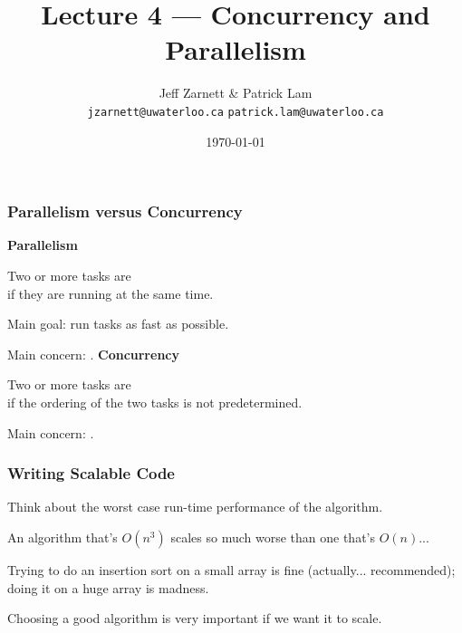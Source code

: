 

\title{Lecture 4 --- Concurrency and Parallelism }

\author{Jeff Zarnett \& Patrick Lam \\ \small \texttt{jzarnett@uwaterloo.ca} \texttt{patrick.lam@uwaterloo.ca}}
\date{\today}




\begin{frame}
  \titlepage

 \end{frame}

\begin{frame}
  \frametitle{Parallelism versus Concurrency}

  {\bf Parallelism}

  Two or more tasks are \\ \hspace*{2em} if they are running at the same time. 

  Main goal: run tasks as fast as possible. 

  Main concern: .
  \vfill
  {\bf Concurrency}

  Two or more tasks are \\ \hspace*{2em} if the ordering of the two tasks is not 
  predetermined. 

  Main concern: .

\end{frame}




\begin{frame}
\frametitle{Writing Scalable Code}

Think about the worst case run-time performance of the algorithm. 

An algorithm that's $O(n^{3})$ scales so much worse than one that's $O(n)$... 

Trying to do an insertion sort on a small array is fine (actually... recommended); doing it on a huge array is madness.

Choosing a good algorithm is very important if we want it to scale. 

\end{frame}

